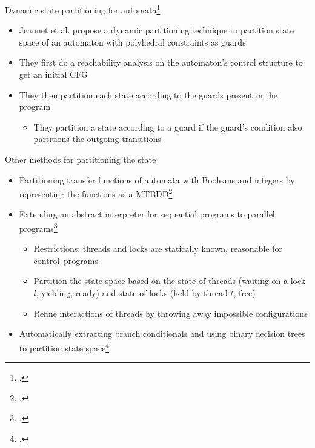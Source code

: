 \documentclass[aspectratio=169]{beamer}
\begin{document}
\begin{frame}{Dynamic state partitioning for automata\footcite{jeannet_dynamic_1999}}
  \begin{itemize}[<+->]
  \item Jeannet et al. propose a dynamic partitioning technique to partition state space of an automaton with polyhedral constraints as guards
  \item They first do a reachability analysis on the automaton's control structure to get an initial CFG
  \item They then partition each state according to the guards present in the program
    \begin{itemize}
    \item They partition a state according to a guard if the guard's condition also partitions the outgoing transitions 
    \end{itemize}
  \end{itemize}
\end{frame}

\begin{frame}{Other methods for partitioning the state}
  \begin{itemize}[<+->]
  \item Partitioning transfer functions of automata with Booleans and integers by representing the functions as a MTBDD\footcite{jeannet_representing_2002} 
  \item Extending an abstract interpreter for sequential programs to parallel programs\footcite{mine2011static}
    \begin{itemize}
    \item Restrictions: threads and locks are statically known, reasonable for control~programs
    \item Partition the state space based on the state of threads (waiting on a lock $l$, yielding, ready) and state of locks (held by thread $t$, free)
    \item Refine interactions of threads by throwing away impossible configurations
    \end{itemize}
  \item Automatically extracting branch conditionals and using binary decision trees to partition state space\footcite{chen2015binary}
  \end{itemize}
\end{frame}
\end{document}
